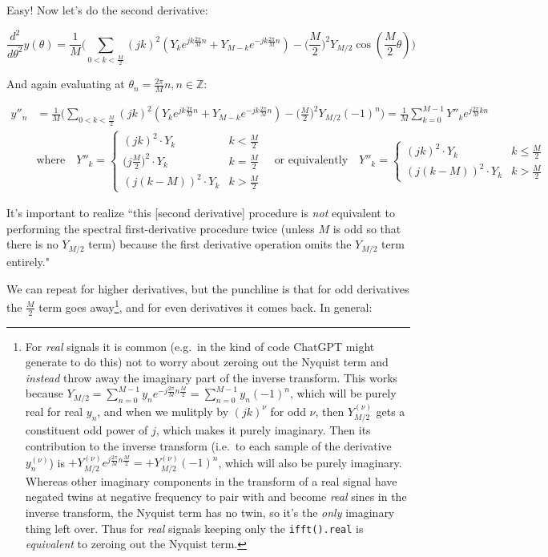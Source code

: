 \documentclass[10pt]{article}
\begin{document}
Easy! Now let's do the second derivative:

$$\frac{d^2}{d\theta^2} y(\theta) = \frac{1}{M} \Big( \sum_{0 < k < \frac{M}{2}} (jk)^2 (Y_k e^{j k \frac{2\pi}{M}n} + Y_{M-k} e^{-j k \frac{2\pi}{M}n}) - \Big(\frac{M}{2}\Big)^2 Y_{M/2} \cos(\frac{M}{2}\theta) \Big)$$

And again evaluating at $\theta_n = \frac{2\pi}{M}n, n \in \mathbb{Z}$:\vspace{-5mm}

\begin{align*}
y''_n &= \frac{1}{M} \Big( \sum_{0 < k < \frac{M}{2}} (jk)^2 (Y_k e^{j k \frac{2\pi}{M}n} + Y_{M-k} e^{-j k \frac{2\pi}{M}n}) - \Big(\frac{M}{2}\Big)^2 Y_{M/2} (-1)^n \Big) = \frac{1}{M} \sum_{k = 0}^{M-1} Y''_k e^{j\frac{2\pi}{M}kn} \\
& \text{where} \quad Y''_k = \begin{cases} (j k)^2 \cdot Y_k & k < \frac{M}{2} \\ \Big(j\frac{M}{2}\Big)^2 \cdot Y_k & k = \frac{M}{2} \\ (j(k - M))^2 \cdot Y_k & k > \frac{M}{2} \end{cases} \quad \text{or equivalently} \quad Y''_k = \begin{cases} (j k)^2 \cdot Y_k & k \leq \frac{M}{2} \\ (j(k - M))^2 \cdot Y_k & k > \frac{M}{2} \end{cases}
\end{align*}

It's important to realize ``this [second derivative] procedure is \textit{not} equivalent to performing the spectral first-derivative procedure twice (unless $M$ is odd so that there is no $Y_{M/2}$ term) because the first derivative operation omits the $Y_{M/2}$ term entirely."\cite{johnson}

We can repeat for higher derivatives, but the punchline is that for odd derivatives the $\frac{M}{2}$ term goes away\footnote{For \textit{real} signals it is common (e.g.~in the kind of code ChatGPT might generate to do this) not to worry about zeroing out the Nyquist term and \textit{instead} throw away the imaginary part of the inverse transform. This works because $Y_{M/2} = \sum_{n=0}^{M-1} y_n e^{-j\frac{2\pi}{M} n \frac{M}{2}} = \sum_{n=0}^{M-1} y_n (-1)^n$, which will be purely real for real $y_n$, and when we mulitply by $(jk)^\nu$ for odd $\nu$, then $Y_{M/2}^{(\nu)}$ gets a constituent odd power of $j$, which makes it purely imaginary. Then its contribution to the inverse transform (i.e.~to each sample of the derivative $y_n^{(\nu)}$) is $+Y_{M/2}^{(\nu)} e^{j\frac{2\pi}{M}n\frac{M}{2}} = +Y_{M/2}^{(\nu)} (-1)^n$, which will also be purely imaginary. Whereas other imaginary components in the transform of a real signal have negated twins at negative frequency to pair with and become \textit{real} sines in the inverse transform, the Nyquist term has no twin, so it's the \textit{only} imaginary thing left over. Thus for \textit{real} signals keeping only the \texttt{ifft().real} is \textit{equivalent} to zeroing out the Nyquist term.}, and for even derivatives it comes back. In general:
\end{document}
